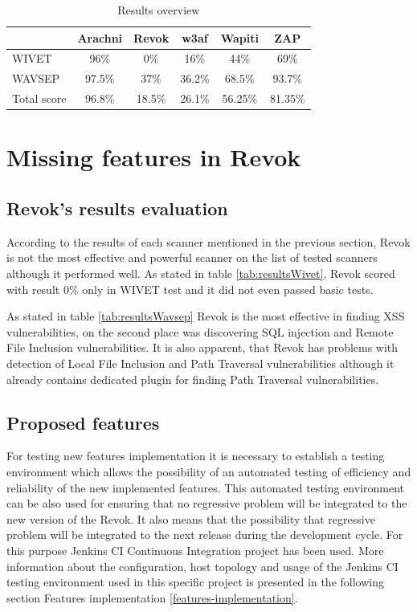 	\begin {table}[H]
	\begin{center}
	\bgroup
	\def\arraystretch{1.2}
	\begin{tabular}{| l | ccccc |}
    \hline
	 				& Arachni	& Revok 	& w3af		& Wapiti	& ZAP		\\ \hline
	WIVET			& 96\%		& 0\%		& 16\%		& 44\%		& 69\%		\\ \hline
	WAVSEP			& 97.5\%	& 37\%		& 36.2\%	& 68.5\%	& 93.7\% 	\\ \hline
	Total score 	& 96.8\%	& 18.5\%	& 26.1\%	& 56.25\%	& 81.35\%	\\ \hline
	\end{tabular}
	\egroup
	\caption{Results overview}
	\label{tab:resultsOverview} 
	\end{center}
	\end {table}


\chapter{Missing features in Revok}\label{missing-features}

	\section{Revok's results evaluation}

	According to the results of each scanner mentioned in the previous section, Revok is not the most effective and powerful scanner on the list of tested scanners although it performed well. As stated in table \ref{tab:resultsWivet}, Revok scored with result 0\% only in WIVET test and it did not even passed basic tests.
	
	As stated in table \ref{tab:resultsWavsep} Revok is the most effective in finding XSS vulnerabilities, on the second place was discovering SQL injection and Remote File Inclusion vulnerabilities. It is also apparent, that Revok has problems with detection of Local File Inclusion and Path Traversal vulnerabilities although it already contains dedicated plugin for finding Path Traversal vulnerabilities.
	
	\section{Proposed features}\label{proposed-features}
	
	For testing new features implementation it is necessary to establish a testing environment which allows the possibility of an automated testing of efficiency and reliability of the new implemented features. This automated testing environment can be also used for ensuring that no regressive problem will be integrated to the new version of the Revok. It also means that the possibility that regressive problem will be integrated to the next release during the development cycle. For this purpose Jenkins CI Continuous Integration project has been used. More information about the configuration, host topology and usage of the Jenkins CI testing environment used in this specific project is presented in the following section Features implementation \ref{features-implementation}.
	
